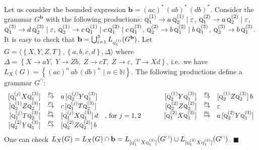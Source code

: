 \documentclass[final]{llncs}
\def\set#1{{\left\{ #1 \right\}}}
\def\tuple#1{{\langle #1 \rangle}}
\def\nats{{\mathbb{N}}}
\def\prod{\Delta}
\def\pat{{\mathbf{b}}}
\begin{document}
\begin{example}\label{ex:bounded-expression1}
  Let us consider the bounded expression $\pat = (ac)^* \, (ab)^* \, (db)^*$. 
  Consider the grammar $G^\pat$ with the following productions: 
  \(\textsc{q}_1^{(1)} \rightarrow a\, \textsc{q}_2^{(1)} \mid \varepsilon\),  
  \(\textsc{q}_1^{(2)} \rightarrow a\, \textsc{q}_2^{(2)} \mid \varepsilon\),
  \(\textsc{q}_1^{(3)} \rightarrow d\, \textsc{q}_2^{(3)} \mid \varepsilon\),
  \(\textsc{q}_2^{(1)} \rightarrow c\, \textsc{q}_1^{(1)} \mid c\, \textsc{q}_1^{(2)} \mid c\, \textsc{q}_1^{(3)}\),
  \(\textsc{q}_2^{(2)} \rightarrow b\, \textsc{q}_1^{(2)} \mid b\, \textsc{q}_1^{(3)}\),
  \(\textsc{q}_2^{(3)} \rightarrow b\, \textsc{q}_1^{(3)}\). 
It is easy to check that $\pat = \bigcup_{i=1}^3L_{\textsc{q}_1^{(i)}}(G^\pat)$.  
  Let $G = \tuple{\set{X,Y,Z,T}, \set{a,b,c,d}, \prod}$ where 
  $\prod = \set{X \rightarrow aY,\; Y \rightarrow Zb,\; Z \rightarrow cT,\; Z \rightarrow \varepsilon,\; T \rightarrow Xd}$, 
  i.e.\ we have $L_X(G)=\set{(ac)^n \, ab \, (db)^n \mid n \in \nats}$.  The following productions define a grammar $G^\cap$: 
  {\small\[\begin{array}{rcllcrcllcrcll}
\lbrack\textsc{q}_1^{(j)} X \textsc{q}_1^{(3)}\rbrack & \stackrel{p_1}{\rightarrow} & a \,    \lbrack\textsc{q}_2^{(j)} Y \textsc{q}_1^{(3)}\rbrack & & \hspace*{.5cm} &
\lbrack\textsc{q}_2^{(1)} Y \textsc{q}_1^{(3)}\rbrack & \stackrel{p_2}{\rightarrow} & \lbrack\textsc{q}_2^{(1)} Z \textsc{q}_2^{(3)}\rbrack \,    b \\
\lbrack\textsc{q}_2^{(1)} Z \textsc{q}_2^{(3)}\rbrack & \stackrel{p_3}{\rightarrow} & c \,    \lbrack\textsc{q}_1^{(j)} T \textsc{q}_2^{(3)}\rbrack & & \hspace*{.5cm} &
\lbrack\textsc{q}_2^{(2)} Z \textsc{q}_2^{(2)}\rbrack & \stackrel{p_4}{\rightarrow} & \varepsilon\\
\lbrack\textsc{q}_1^{(j)} T \textsc{q}_2^{(3)}\rbrack & \stackrel{p_5}{\rightarrow} & \lbrack\textsc{q}_1^{(j)} X \textsc{q}_1^{(3)}\rbrack \,    d & \mbox{, for $j=1,2$} & &
\lbrack\textsc{q}_1^{(2)} X \textsc{q}_1^{(3)}\rbrack & \stackrel{p_6}{\rightarrow} & a \,    \lbrack\textsc{q}_2^{(2)} Y \textsc{q}_1^{(3)}\rbrack \\
\lbrack\textsc{q}_2^{(2)} Y \textsc{q}_1^{(3)}\rbrack & \stackrel{p_7}{\rightarrow} & \lbrack\textsc{q}_2^{(2)} Z \textsc{q}_2^{(2)}\rbrack \,    b 
\end{array}\]}
One can check $L_X(G) =  L_X(G) \cap \pat = L_{[\textsc{q}_1^{(1)} X \textsc{q}_1^{(3)}]}(G^\cap) \cup L_{[\textsc{q}_1^{(2)} X
      \textsc{q}_1^{(3)}]}(G^\cap)$. \(\blacksquare\)
\end{example}
\end{document}
